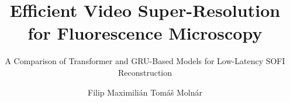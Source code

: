 \documentclass{tudelft-report}
\begin{document}
\frontmatter

\title{Efficient Video Super-Resolution for Fluorescence Microscopy}
\subtitle{A Comparison of Transformer and GRU-Based Models for Low-Latency SOFI Reconstruction}
\author{Filip Maximilián Tomáš Molnár}


\makecover


% 


\tableofcontents




\mainmatter









\setcounter{biburlnumpenalty}{7000}
\setcounter{biburllcpenalty}{7000}
\setcounter{biburlucpenalty}{7000}

\printbibliography[heading=bibintoc,title=References]


\appendix







% 
\end{document}
